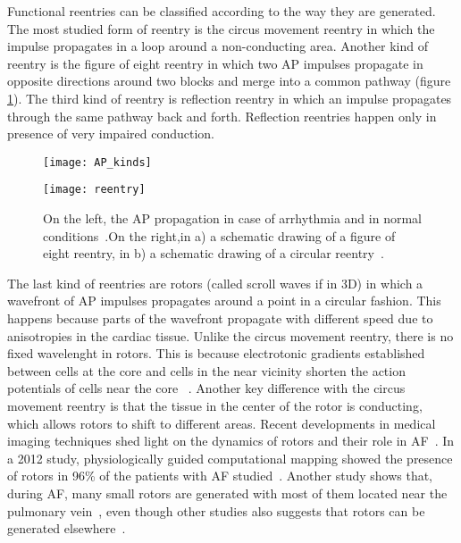 \documentclass{article}
\begin{document}
Functional reentries can be classified according to the way they are generated. The most studied form of reentry is the circus movement reentry in which the impulse propagates in a loop around a non-conducting area. Another kind of reentry is the figure of eight reentry in which two AP impulses propagate in opposite directions around two blocks and merge into a common pathway (figure \ref{APimage}). The third kind of reentry is reflection reentry in which an impulse propagates through the same pathway back and forth. Reflection reentries happen only in presence of very impaired conduction. 



\begin{figure}[H]
\vspace{1cm}
\hspace{-4cm}
\centering
\begin{minipage}[t]{.5\textwidth}
  \centering
  \texttt{[image: AP\_kinds]}
  \label{AP}
\end{minipage}%
\begin{minipage}[t]{.5\textwidth}
  \centering
  \texttt{[image: reentry]}
  \label{reentry}
\end{minipage}
\caption{On the left, the AP propagation in case of arrhythmia and in normal conditions~\cite{arrhythmia_review2012}.On the right,in a) a schematic drawing of a figure of eight reentry, in b) a schematic drawing of a circular reentry~\cite{arrhythmia_figurecircle}.}
\label{APimage}
\end{figure}

The last kind of reentries are rotors (called scroll waves if in 3D) in which a wavefront of AP impulses propagates around a point in a circular fashion. This happens because parts of the wavefront propagate with different speed due to anisotropies in the cardiac tissue. Unlike the circus movement reentry, there is no fixed wavelenght in rotors. This is because electrotonic gradients established between cells at the core and cells in the near vicinity shorten the action potentials of cells near the core~\cite{arrhythmia_rotorsreview2013} . Another key difference with the circus movement reentry is that the tissue in the center of the rotor is conducting, which allows rotors to shift to different areas. Recent developments in medical imaging techniques shed light on the dynamics of rotors and their role in AF~\cite{arrhythmia_rotorsreview2013}. In a 2012 study, physiologically guided computational mapping showed the presence of rotors in 96\% of the patients with AF studied~\cite{arrhythmia_rotors2012}. Another study shows that, during AF, many small rotors are generated with most of them located near the pulmonary vein~\cite{arrhythmia_pulmonaryvein1998}, even though other studies also suggests that rotors can be generated elsewhere~\cite{arrhythmia_venacava2000}. 
\end{document}
